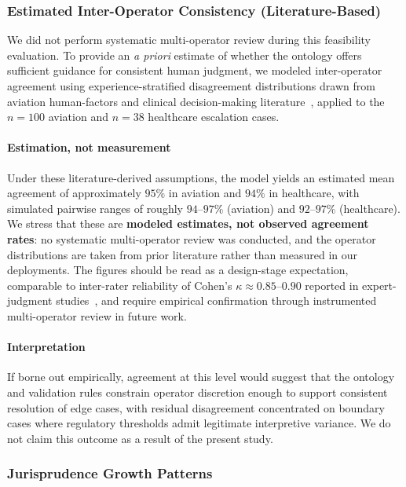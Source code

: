 \documentclass[sigconf,nonacm]{acmart}
\begin{document}
\subsubsection{Estimated Inter-Operator Consistency (Literature-Based)}
\label{sec:inter-operator}

We did not perform systematic multi-operator review during this feasibility
evaluation. To provide an \emph{a priori} estimate of whether the ontology
offers sufficient guidance for consistent human judgment, we modeled
inter-operator agreement using experience-stratified disagreement
distributions drawn from aviation human-factors and clinical
decision-making literature~\cite{kahneman2009conditions}, applied to the
$n=100$ aviation and $n=38$ healthcare escalation cases.

\paragraph{Estimation, not measurement} Under these literature-derived
assumptions, the model yields an estimated mean agreement of approximately
$95\%$ in aviation and $94\%$ in healthcare, with simulated pairwise ranges
of roughly $94$--$97\%$ (aviation) and $92$--$97\%$ (healthcare). We stress
that these are \textbf{modeled estimates, not observed agreement rates}:
no systematic multi-operator review was conducted, and the operator
distributions are taken from prior literature rather than measured in our
deployments. The figures should be read as a design-stage expectation,
comparable to inter-rater reliability of Cohen's $\kappa \approx 0.85$--$0.90$
reported in expert-judgment studies~\cite{kahneman2009conditions}, and
require empirical confirmation through instrumented multi-operator review
in future work.

\paragraph{Interpretation} If borne out empirically, agreement at this level
would suggest that the ontology and validation rules constrain operator
discretion enough to support consistent resolution of edge cases, with
residual disagreement concentrated on boundary cases where regulatory
thresholds admit legitimate interpretive variance. We do not claim this
outcome as a result of the present study.

\subsubsection{Jurisprudence Growth Patterns}
\end{document}
